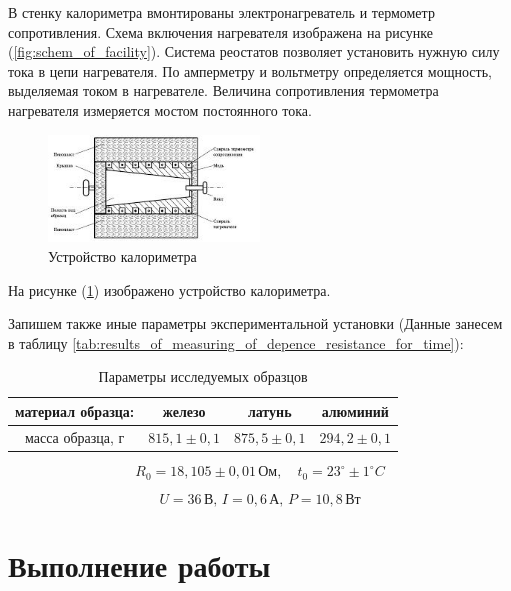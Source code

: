 \documentclass[12pt,a4paper]{article}
\begin{document}
	В стенку калориметра вмонтированы электронагреватель и термометр сопротивления. Схема включения нагревателя изображена на рисунке (\ref{fig:schem_of_facility}). Система реостатов позволяет установить нужную силу тока в цепи нагревателя. По амперметру и вольтметру определяется мощность, выделяемая током в нагревателе. Величина сопротивления термометра нагревателя  измеряется мостом постоянного тока.
	
	\begin{figure}[h!]
		\begin{center}
			\includegraphics[width = 0.5\textwidth]{Ris_of_facility}
			\caption{Устройство калориметра}
			\label{fig:Ris_of_facility}
		\end{center}
	\end{figure}	
	
	На рисунке (\ref{fig:Ris_of_facility}) изображено устройство калориметра.
	
	Запишем также иные параметры экспериментальной установки (Данные занесем в таблицу \ref{tab:results_of_measuring_of_depence_resistance_for_time}):
	
	\begin{table}[h!]
		\centering
		\begin{tabular}{|c|c|c|c|}
			\hline
			материал образца: & железо          & латунь          & алюминий        \\ \hline
			масса образца, г  & $815,1 \pm 0,1$ & $875,5 \pm 0,1$ & $294,2 \pm 0,1$ \\ \hline
		\end{tabular}
		\caption{Параметры исследуемых образцов}
		\label{tab:param_of_facility}
	\end{table}
	
	$$R_{0} = 18,105 \pm 0,01 \, \text{Ом}, \quad t_{0} = 23^{\circ} \pm 1 ^{\circ} C$$
	
	$$ U = 36 \, \text{В}, \, I = 0,6 \, \text{А}, \, P = 10,8 \, \text{Вт} $$
	
	
	



	\newpage

\section{Выполнение работы}
\end{document}
